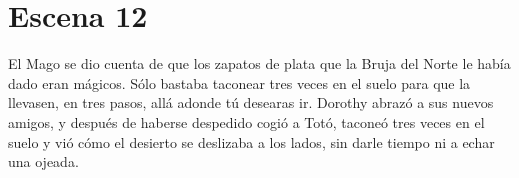 \chapter{Escena 12}
El Mago se dio cuenta de que los zapatos de plata que la Bruja del Norte le había dado eran mágicos.
Sólo bastaba taconear tres veces en el suelo para que la llevasen, en tres pasos, allá adonde tú desearas ir.
Dorothy abrazó a sus nuevos amigos, y después de haberse despedido cogió a Totó, taconeó tres veces en el suelo y vió cómo el desierto se deslizaba a los lados, sin darle tiempo ni a echar una ojeada. 
